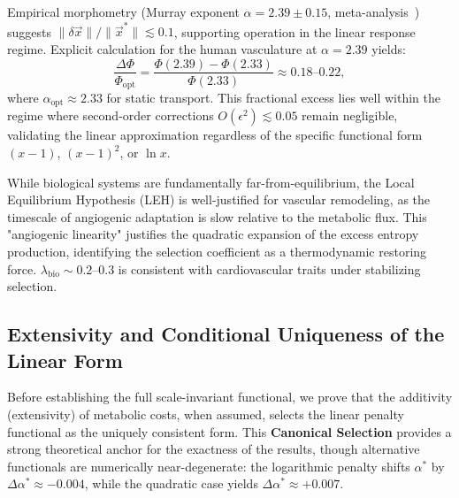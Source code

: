 \begin{remark}
Empirical morphometry (Murray exponent $\alpha = 2.39 \pm 0.15$,
meta-analysis~\cite{taylor2024}) suggests $\|\delta\vec{x}\|/\|\vec{x}^*\|
\lesssim 0.1$, supporting operation in the linear response regime.
Explicit calculation for the human vasculature at $\alpha = 2.39$ yields:
\begin{equation}
    \frac{\Delta\Phi}{\Phi_{\mathrm{opt}}} =
    \frac{\Phi(2.39) - \Phi(2.33)}{\Phi(2.33)} \approx 0.18\text{--}0.22,
\end{equation}
where $\alpha_{\mathrm{opt}} \approx 2.33$ for static transport. This fractional
excess lies well within the regime where second-order corrections $O(\epsilon^2)
\lesssim 0.05$ remain negligible, validating the linear approximation regardless
of the specific functional form $(x-1)$, $(x-1)^2$, or $\ln x$.

While biological systems are fundamentally far-from-equilibrium, the Local
Equilibrium Hypothesis (LEH) is well-justified for vascular remodeling, as the
timescale of angiogenic adaptation is slow relative to the metabolic flux. This
"angiogenic linearity" justifies the quadratic expansion of the excess entropy
production, identifying the selection coefficient as a thermodynamic restoring
force. $\lambda_{\mathrm{bio}} \sim 0.2$--$0.3$ is consistent with
cardiovascular traits under stabilizing selection.
\end{remark}

\subsection{Extensivity and Conditional Uniqueness of the Linear Form}

Before establishing the full scale-invariant functional, we prove that the
additivity (extensivity) of metabolic costs, when assumed, selects the linear
penalty functional as the uniquely consistent form. This \textbf{Canonical
Selection} provides a strong theoretical anchor for the exactness of the
results, though alternative functionals are numerically near-degenerate:
the logarithmic penalty shifts $\alpha^*$ by $\Delta \alpha^* \approx -0.004$,
while the quadratic case yields $\Delta \alpha^* \approx +0.007$.

